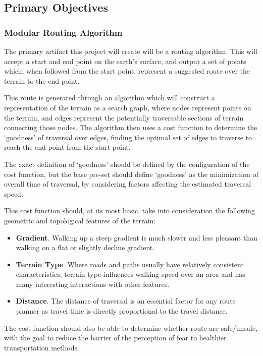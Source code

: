 \documentclass[12pt]{article}
\begin{document}
\subsection{Primary Objectives}

\subsubsection{Modular Routing Algorithm}

The primary artifact this project will create will be a routing algorithm. This will accept a start and end point on the earth's surface, and output a set of points which, when followed from the start point, represent a suggested route over the terrain to the end point.

This route is generated through an algorithm which will construct a representation of the terrain as a search graph, where nodes represent points on the terrain, and edges represent the potentially traversable sections of terrain connecting those nodes. The algorithm then uses a cost function to determine the `goodness' of traversal over edges, finding the optimal set of edges to traverse to reach the end point from the start point.

The exact definition of `goodness' should be defined by the configuration of the cost function, but the base pre-set should define `goodness' as the minimization of overall time of traversal, by considering factors affecting the estimated traversal speed.

This cost function should, at its most basic, take into consideration the following geometric and topological features of the terrain:

\begin{itemize}
  \item \textbf{Gradient}. Walking up a steep gradient is much slower and less pleasant than walking on a flat or slightly decline gradient.
  \item \textbf{Terrain Type}. Where roads and paths usually have relatively consistent characteristics, terrain type influences walking speed over an area and has many interesting interactions with other features.
  \item \textbf{Distance}. The distance of traversal is an essential factor for any route planner as travel time is directly proportional to the travel distance.
\end{itemize}

The cost function should also be able to determine whether route are safe/unsafe, with the goal to reduce the barrier of the perception of fear to healthier transportation methods.
\end{document}
